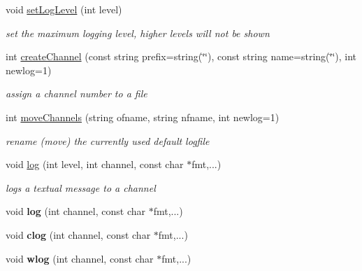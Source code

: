 \begin{DoxyCompactItemize}
\mbox{\label{classLogger_a76737728e58470cc99536839d6fbd631}} 
void \hyperlink{classLogger_a76737728e58470cc99536839d6fbd631}{set\+Log\+Level} (int level)
\begin{DoxyCompactList}\small\item\em set the maximum logging level, higher levels will not be shown \end{DoxyCompactList}\item 
int \hyperlink{classLogger_a61e5d07bd9b1fd3296e737063d9e1809}{create\+Channel} (const string prefix=string(\char`\"{}\char`\"{}), const string name=string(\char`\"{}\char`\"{}), int newlog=1)
\begin{DoxyCompactList}\small\item\em assign a channel number to a file \end{DoxyCompactList}\item 
\mbox{\label{classLogger_ae0584bd848e6f8beefbdad3f5f1d614c}} 
int \hyperlink{classLogger_ae0584bd848e6f8beefbdad3f5f1d614c}{move\+Channels} (string ofname, string nfname, int newlog=1)
\begin{DoxyCompactList}\small\item\em rename (move) the currently used default logfile \end{DoxyCompactList}\item 
void \hyperlink{classLogger_a3277d0171f23be48ef40d86a01786284}{log} (int level, int channel, const char $\ast$fmt,...)
\begin{DoxyCompactList}\small\item\em logs a textual message to a channel \end{DoxyCompactList}\item 
\mbox{\label{classLogger_a5156a9f382bb302b678e484c0ed7f2ef}} 
void {\bfseries log} (int channel, const char $\ast$fmt,...)
\item 
\mbox{\label{classLogger_a07a7ccd017f70af90b52440c8c4b6a19}} 
void {\bfseries clog} (int channel, const char $\ast$fmt,...)
\item 
\mbox{\label{classLogger_a87d34dedccbfbd0526cb1e0f352dfca2}} 
void {\bfseries wlog} (int channel, const char $\ast$fmt,...)
\item 
\mbox{\label{classLogger_aced539367fd2e477df2b78ab92e22e7f}} 

\end{DoxyCompactItemize}
